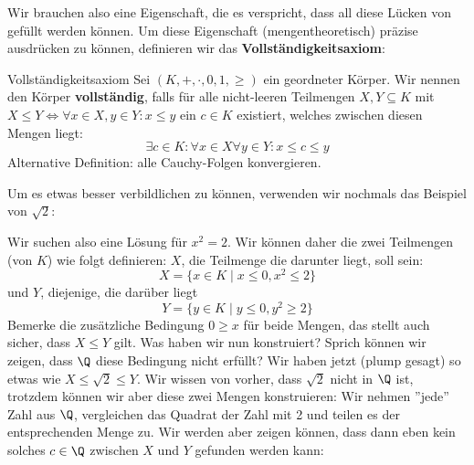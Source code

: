 Wir brauchen also eine Eigenschaft, die es verspricht, dass all diese Lücken von gefüllt werden können. Um diese Eigenschaft (mengentheoretisch) präzise ausdrücken zu können, definieren wir das \textbf{Vollständigkeitsaxiom}:
\begin{definition}{Vollständigkeitsaxiom}{}
Sei $(K, + ,\cdot, 0, 1, \geq)$ ein geordneter Körper. Wir nennen den Körper \textbf{vollständig}, falls für alle nicht-leeren Teilmengen $X,Y \subseteq K$ mit $X \leq Y \iff \forall x\in X, y \in Y: x \leq y$ ein $c \in K$ existiert, welches zwischen diesen Mengen liegt:
$$\exists c \in K: \forall x\in X \forall y \in Y: x \leq c \leq y$$
Alternative Definition: alle Cauchy-Folgen konvergieren.
\end{definition}
Um es etwas besser verbildlichen zu können, verwenden wir nochmals das Beispiel von $\sqrt{2}$:
\begin{example} \label{ex_Q_not_complete} Wir suchen also eine Lösung für $x^2 = 2$. Wir können daher die zwei Teilmengen (von $K$) wie folgt definieren: $X$, die Teilmenge die darunter liegt, soll sein:
$$X = \{x \in K \mid x \leq 0, x^2 \leq 2 \}$$
und $Y$, diejenige, die darüber liegt
$$Y = \{y \in K \mid y \leq 0, y^2 \geq 2 \}$$
Bemerke die zusätzliche Bedingung $0 \geq x$ für beide Mengen, das stellt auch sicher, dass $X \leq Y$ gilt. Was haben wir nun konstruiert? Sprich können wir zeigen, dass $\Q$ diese Bedingung nicht erfüllt? Wir haben jetzt (plump gesagt) so etwas wie $X \leq \sqrt{2} \leq Y$. Wir wissen von vorher, dass $\sqrt{2}$ nicht in $\Q$ ist, trotzdem können wir aber diese zwei Mengen konstruieren: Wir nehmen ''jede'' Zahl aus $\Q$, vergleichen das Quadrat der Zahl mit 2 und teilen es der entsprechenden Menge zu. Wir werden aber zeigen können, dass dann eben kein solches $c \in \Q$ zwischen $X$ und $Y$ gefunden werden kann:


\end{example}
